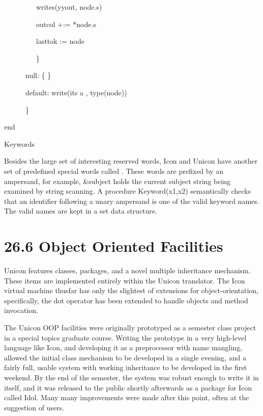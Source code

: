 {\ttfamily\mdseries
\ \ \ \ \ \ \ \ \ writes(yyout, node.s)}

{\ttfamily\mdseries
\ \ \ \ \ \ \ \ \ outcol +:= *node.s}

{\ttfamily\mdseries
\ \ \ \ \ \ \ \ \ lasttok := node}

{\ttfamily\mdseries
\ \ \ \ \ \ \ \ \ \}}

{\ttfamily\mdseries
\ \ \ \ \ \ {\textquotedbl}null{\textquotedbl}: \{ \}}

{\ttfamily\mdseries
\ \ \ \ \ \ default: write({\textquotedbl}its a {\textquotedbl}, type(node))}

{\ttfamily\mdseries
\ \ \ \ \ \ \}}

{\ttfamily\mdseries
end}

{\sffamily
Keywords }


Besides the large set of interesting reserved words, Icon and Unicon
have another set of predefined special words called
. These words are prefixed by an
ampersand, for example, \&subject holds the current
{\textquotedbl}subject{\textquotedbl} string being examined by string
scanning. A procedure Keyword(x1,x2) semantically checks that an
identifier following a unary ampersand is one of the valid keyword
names. The valid names are kept in a set data structure.


\section[26.6 Object Oriented Facilities]{26.6 Object Oriented Facilities}

Unicon features classes, packages, and a novel multiple inheritance
mechanism. These items are implemented entirely within the Unicon
translator. The Icon virtual machine thusfar has only the slightest of
extensions for object-orientation, specifically, the dot operator has
been extended to handle objects and method invocation.

The Unicon OOP facilities were originally prototyped as a semester
class project in a {\textquotedbl}special topics{\textquotedbl}
graduate course. Writing the prototype in a very high-level language
like Icon, and developing it as a preprocessor with name mangling,
allowed the initial class mechanism to be developed in a single
evening, and a fairly full, usable system with working inheritance to
be developed in the first weekend. By the end of the semester, the
system was robust enough to write it in itself, and it was released to
the public shortly afterwards as a package for Icon called
{\textquotedbl}Idol{\textquotedbl}. Many many improvements were made
after this point, often at the suggestion of users.

